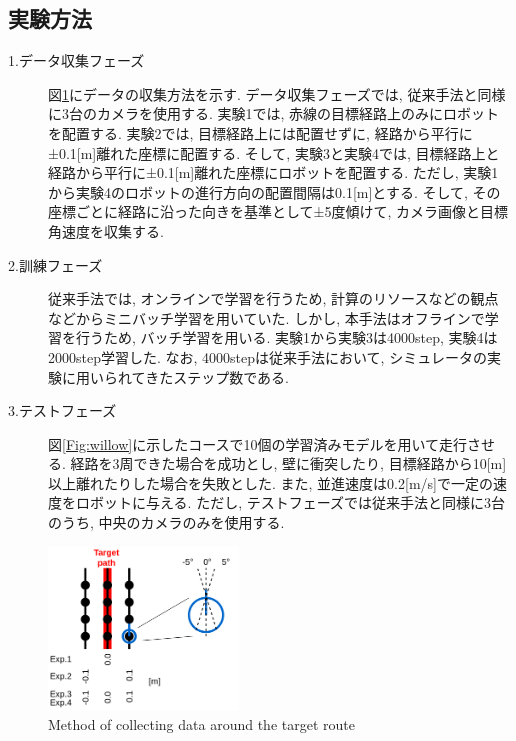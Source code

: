 \documentclass{ujarticle}
\begin{document}
\newpage
\subsection{実験方法}
\begin{description}
		\item[1.データ収集フェーズ]図\ref{Fig:collect-data}にデータの収集方法を示す. データ収集フェーズでは, 従来手法と同様に3台のカメラを使用する. 実験1では, 赤線の目標経路上のみにロボットを配置する. 実験2では, 目標経路上には配置せずに, 経路から平行に±0.1[m]離れた座標に配置する. そして, 実験3と実験4では, 目標経路上と経路から平行に±0.1[m]離れた座標にロボットを配置する. ただし, 実験1から実験4のロボットの進行方向の配置間隔は0.1[m]とする. そして, その座標ごとに経路に沿った向きを基準として±5度傾けて, カメラ画像と目標角速度を収集する. 
		\item[2.訓練フェーズ]従来手法では, オンラインで学習を行うため, 計算のリソースなどの観点などからミニバッチ学習を用いていた. しかし, 本手法はオフラインで学習を行うため, バッチ学習を用いる. 実験1から実験3は4000step, 実験4は2000step学習した. なお, 4000stepは従来手法において, シミュレータの実験に用いられてきたステップ数である. 
		\item[3.テストフェーズ]図\ref{Fig:willow}に示したコースで10個の学習済みモデルを用いて走行させる. 経路を3周できた場合を成功とし, 壁に衝突したり, 目標経路から10[m]以上離れたりした場合を失敗とした. また, 並進速度は0.2[m/s]で一定の速度をロボットに与える. ただし, テストフェーズでは従来手法と同様に3台のうち, 中央のカメラのみを使用する. 
\end{description}

\begin{figure}[h]
		\centering
		\includegraphics[width=0.45\textwidth]{img/collect2.png}
		\caption{Method of collecting data around the target route}
		\label{Fig:collect-data}
\end{figure}

\newpage
\end{document}
